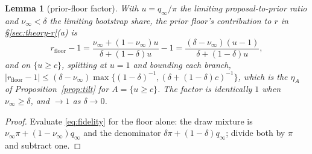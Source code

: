 \documentclass[10pt]{article}
\theoremstyle{plain}
\newtheorem{lemma}[theorem]{Lemma}
\theoremstyle{definition}
\begin{document}
\begin{lemma}[prior-floor factor]\label{lem:floor}
With $u=q_\infty/\pi$ the limiting proposal-to-prior ratio and $\nu_\infty<\delta$ the limiting bootstrap share, the prior floor's contribution to $r$ in \S\ref{sec:theory-r}(a) is
\[
r_{\mathrm{floor}}-1=\frac{\nu_\infty+(1-\nu_\infty)u}{\delta+(1-\delta)u}-1=\frac{(\delta-\nu_\infty)(u-1)}{\delta+(1-\delta)u},
\]
and on $\{u\ge c\}$, splitting at $u=1$ and bounding each branch, $|r_{\mathrm{floor}}-1|\le(\delta-\nu_\infty)\max\{(1-\delta)^{-1},(\delta+(1-\delta)c)^{-1}\}$, which is the $\eta_A$ of Proposition~\ref{prop:tilt} for $A=\{u\ge c\}$. The factor is identically $1$ when $\nu_\infty\ge\delta$, and $\to1$ as $\delta\to0$.
\end{lemma}
\begin{proof}
Evaluate \eqref{eq:fidelity} for the floor alone: the draw mixture is $\nu_\infty\pi+(1-\nu_\infty)q_\infty$ and the denominator $\delta\pi+(1-\delta)q_\infty$; divide both by $\pi$ and subtract one.
\end{proof}
\end{document}
